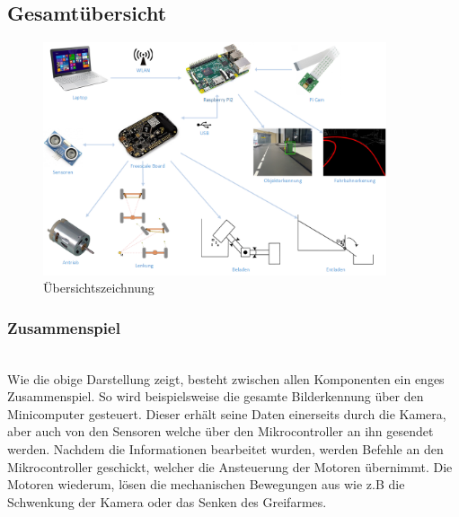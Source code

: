 \subsection{Gesamtübersicht}

\begin{figure}[H]%
\centering
\includegraphics[width=0.9\textwidth]{03_Loesungskonzept/pictures/uebersichtszeichnung.png}
\caption{Übersichtszeichnung}
\label{fig:Übersichtszeichnung}
\end{figure}\flushleft

\subsubsection{Zusammenspiel}\\[0.2cm]
Wie die obige Darstellung zeigt, besteht zwischen allen Komponenten ein enges Zusammenspiel.
So wird beispielsweise die gesamte Bilderkennung über den Minicomputer gesteuert. Dieser erhält seine Daten einerseits durch die Kamera, aber auch von den Sensoren welche über den Mikrocontroller an ihn gesendet werden. Nachdem die Informationen bearbeitet wurden, werden Befehle an den Mikrocontroller geschickt, welcher die Ansteuerung der Motoren übernimmt. Die Motoren wiederum, lösen die mechanischen Bewegungen aus wie z.B die Schwenkung der Kamera oder das Senken des Greifarmes.\\[0.2cm]
